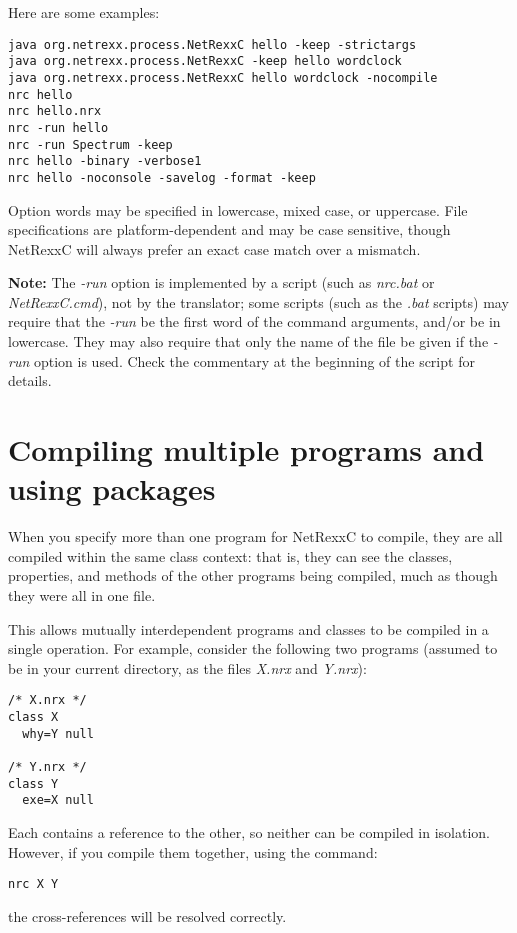 Here are some examples:
\begin{verbatim}
java org.netrexx.process.NetRexxC hello -keep -strictargs
java org.netrexx.process.NetRexxC -keep hello wordclock
java org.netrexx.process.NetRexxC hello wordclock -nocompile
nrc hello
nrc hello.nrx
nrc -run hello
nrc -run Spectrum -keep
nrc hello -binary -verbose1
nrc hello -noconsole -savelog -format -keep
\end{verbatim}

Option words may be specified in lowercase, mixed case, or uppercase.
File specifications are platform-dependent and may be case sensitive,
though NetRexxC will always prefer an exact case match over a mismatch.

\textbf{Note:} The \emph{-run} option is implemented by a script (such
as \emph{nrc.bat} or \emph{NetRexxC.cmd}), not by the translator; some
scripts (such as the \emph{.bat} scripts) may require that
the \emph{-run} be the first word of the command arguments, and/or be in
lowercase.  They may also require that only the name of the file be
given if the \emph{-run} option is used.  Check the commentary at the
beginning of the script for details.

\section{Compiling multiple programs and using packages}

When you specify more than one program for NetRexxC to compile, they are
all compiled within the same class context: that is, they can see
the classes, properties, and methods of the other programs being
compiled, much as though they were all in one file.

This allows mutually interdependent programs and classes to be compiled
in a single operation.  For example, consider the following two programs
(assumed to be in your current directory, as the files \emph{X.nrx}
and \emph{Y.nrx}):
\begin{verbatim}
/* X.nrx */
class X
  why=Y null

/* Y.nrx */
class Y
  exe=X null
\end{verbatim}
Each contains a reference to the other, so neither can be compiled in
isolation.  However, if you compile them together, using the command:
\begin{verbatim}
nrc X Y
\end{verbatim}
 the cross-references will be resolved correctly.

